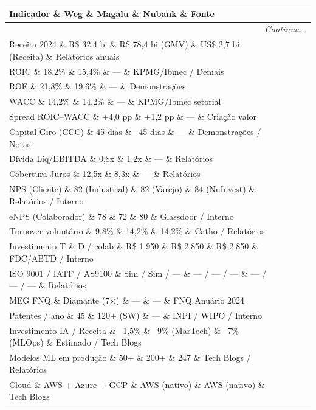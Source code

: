 \begin{longtable}{p{3cm}p{3cm}p{3cm}p{3cm}p{4cm}}
\toprule
\textbf{Indicador} \& \textbf{Weg} \& \textbf{Magalu} \& \textbf{Nubank} \& \textbf{Fonte}\\
\midrule
\endhead
\midrule
\multicolumn{5}{r}{\textit{Continua...}} \\
\endfoot
\bottomrule
\endlastfoot

Receita 2024 \& R\$ 32,4 bi \& R\$ 78,4 bi (GMV) \& US\$ 2,7 bi (Receita) \& Relatórios anuais\\
ROIC \& 18,2\% \& 15,4\% \& — \& KPMG/Ibmec / Demais \\
ROE \& 21,8\% \& 19,6\% \& — \& Demonstrações \\
WACC \& 14,2\% \& 14,2\% \& — \& KPMG/Ibmec setorial \\
Spread ROIC–WACC \& +4,0 pp \& +1,2 pp \& — \& Criação valor\\
Capital Giro (CCC) \& 45 dias \& –45 dias \& — \& Demonstrações / Notas\\
Dívida Líq/EBITDA \& 0,8x \& 1,2x \& — \& Relatórios\\
Cobertura Juros \& 12,5x \& 8,3x \& — \& Relatórios\\
NPS (Cliente) \& 82 (Industrial) \& 82 (Varejo) \& 84 (NuInvest) \& Relatórios / Interno\\
eNPS (Colaborador) \& 78 \& 72 \& 80 \& Glassdoor / Interno\\
Turnover voluntário \& 9,8\% \& 14,2\% \& 14,2\% \& Catho / Relatórios \\
Investimento T \& D / colab \& R\$ 1.950 \& R\$ 2.850 \& R\$ 2.850  \&  FDC/ABTD / Interno\\
ISO 9001 / IATF / AS9100 \& Sim / Sim / — \& — / — / — \& — / — / — \& Relatórios\\
MEG FNQ \& Diamante (7×) \& — \& — \& FNQ Anuário 2024\\
Patentes / ano \& 45 \& 120+ (SW) \& — \& INPI / WIPO / Interno\\
Investimento IA / Receita \& ~1,5\% \& ~9\% (MarTech) \& ~7\% (MLOps) \& Estimado / Tech Blogs \\
Modelos ML em produção \& 50+ \& 200+ \& 247 \& Tech Blogs / Relatórios\\
Cloud \& AWS + Azure + GCP \& AWS (nativo) \& AWS (nativo) \& Tech Blogs\\
\end{longtable}

